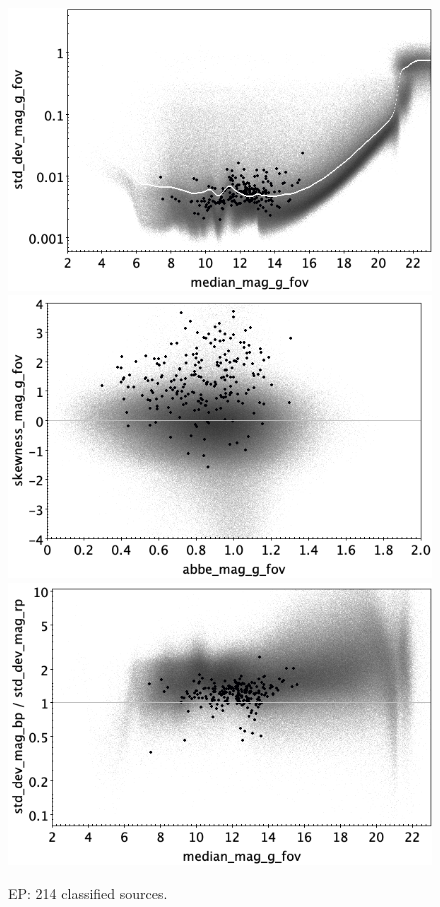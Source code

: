 \documentclass[longauth]{aa}
\begin{document}
\begin{appendix}
\begin{figure}
\hspace{2mm}
 \includegraphics[width=0.45\hsize]{figures/appendix/EP_cls_msd.png} \\ %
\vspace{4mm}
 \includegraphics[width=0.45\hsize]{figures/appendix/EP_cls_ask.png}  %
\hspace{2mm}
 \includegraphics[width=0.45\hsize]{figures/appendix/EP_cls_msdr.png}  \\ %
\vspace{4mm}
 \caption{EP: 214 classified sources.}  
 \label{fig:app:EP}
\end{figure}


\end{appendix}
\end{document}

